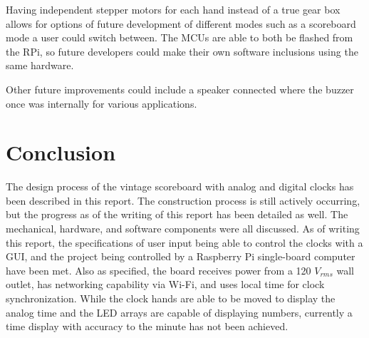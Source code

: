 \documentclass[11pt]{article}
\begin{document}
Having independent stepper motors for each hand instead of a true gear box allows for options of future development of different modes such as a scoreboard mode a user could switch between. The MCUs are able to both be flashed from the RPi, so future developers could make their own software inclusions using the same hardware. 

Other future improvements could include a speaker connected where the buzzer once was internally for various applications. 





\section{Conclusion}
\label{conclusion}

The design process of the vintage scoreboard with analog and digital clocks has been described in this report. 
The construction process is still actively occurring, but the progress as of the writing of this report has been detailed as well. 
The mechanical, hardware, and software components were all discussed. 
As of writing this report, the specifications of user input being able to control the clocks with a GUI, and the project being controlled by a Raspberry Pi single-board computer have been met. 
Also as specified, the board receives power from a 120 $V_{rms}$ wall outlet, has networking capability via Wi-Fi, and uses local time for clock synchronization. 
While the clock hands are able to be moved to display the analog time and the LED arrays are capable of displaying numbers, currently a time display with accuracy to the minute has not been achieved. 
\end{document}
